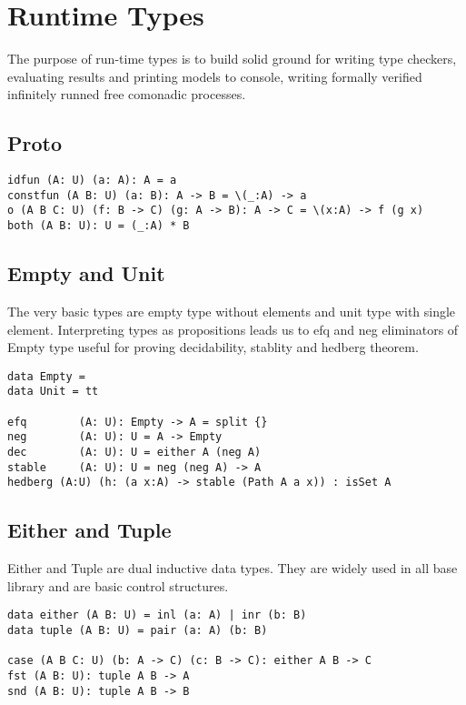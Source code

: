 \documentclass{article}
\begin{document}
\section{Runtime Types}

The purpose of run-time types is to build solid ground for
writing type checkers, evaluating results and printing models to console,
writing formally verified infinitely runned free comonadic processes.

\subsection{Proto}

\begin{lstlisting}[mathescape=true]
idfun (A: U) (a: A): A = a
constfun (A B: U) (a: B): A -> B = \(_:A) -> a
o (A B C: U) (f: B -> C) (g: A -> B): A -> C = \(x:A) -> f (g x)
both (A B: U): U = (_:A) * B
\end{lstlisting}

\subsection{Empty and Unit}

The very basic types are empty type without elements and unit type with single element.
Interpreting types as propositions leads us to efq and neg eliminators of Empty type useful
for proving decidability, stablity and hedberg theorem.

\begin{lstlisting}[mathescape=true]
data Empty =
data Unit = tt

efq        (A: U): Empty -> A = split {}
neg        (A: U): U = A -> Empty
dec        (A: U): U = either A (neg A)
stable     (A: U): U = neg (neg A) -> A
hedberg (A:U) (h: (a x:A) -> stable (Path A a x)) : isSet A
\end{lstlisting}

\subsection{Either and Tuple}

Either and Tuple are dual inductive data types. They are widely used
in all base library and are basic control structures.

\begin{lstlisting}[mathescape=true]
data either (A B: U) = inl (a: A) | inr (b: B)
data tuple (A B: U) = pair (a: A) (b: B)

case (A B C: U) (b: A -> C) (c: B -> C): either A B -> C
fst (A B: U): tuple A B -> A
snd (A B: U): tuple A B -> B
\end{lstlisting}
\end{document}
